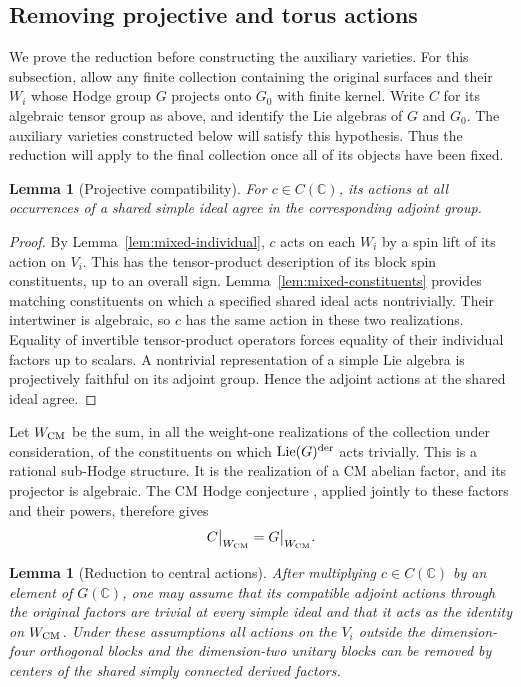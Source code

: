\documentclass[11pt]{article}
\numberwithin{equation}{section}
\newtheorem{lemma}[theorem]{Lemma}
\theoremstyle{definition}
\theoremstyle{remark}
\newcommand{\C}{\mathbb C}
\begin{document}
\subsection{Removing projective and torus actions}

We prove the reduction before constructing the auxiliary varieties.
For this subsection, allow any finite collection containing the original
surfaces and their $W_i$ whose Hodge group $G$ projects onto $G_0$ with
finite kernel.  Write $C$ for its algebraic tensor group as above, and
identify the Lie algebras of $G$ and $G_0$.  The auxiliary varieties
constructed below will satisfy this hypothesis.  Thus the reduction
will apply to the final collection once all of its objects have been
fixed.

\begin{lemma}[Projective compatibility]\label{lem:mixed-projective}
For $c\in C(\C)$, its actions at all occurrences of a shared simple
ideal agree in the corresponding adjoint group.
\end{lemma}

\begin{proof}
By Lemma~\ref{lem:mixed-individual}, $c$ acts on each $W_i$ by a
spin lift of its action on $V_i$.  This has the tensor-product
description of its block spin constituents, up to an overall sign.
Lemma~\ref{lem:mixed-constituents} provides matching constituents
on which a specified shared ideal acts nontrivially.  Their
intertwiner is algebraic, so $c$ has the same action in these two
realizations.  Equality of invertible tensor-product operators
forces equality of their individual factors up to scalars.  A
nontrivial representation of a simple Lie algebra is projectively
faithful on its adjoint group.  Hence the adjoint actions at the
shared ideal agree.
\end{proof}

Let $W_{\rm CM}$ be the sum, in all the weight-one realizations of
the collection under consideration, of the constituents on which
$\operatorname{Lie}(G)^{\rm der}$ acts trivially.  This is a
rational sub-Hodge structure.  It is the realization of a CM abelian
factor, and its projector is algebraic.  The CM Hodge conjecture
\cite[Theorem~1.1]{CM}, applied jointly to these factors and their
powers, therefore gives
\begin{equation}\label{eq:mixed-cm-image}
 C\big|_{W_{\rm CM}}=G\big|_{W_{\rm CM}}.
\end{equation}

\begin{lemma}[Reduction to central actions]\label{lem:mixed-central}
After multiplying $c\in C(\C)$ by an element of $G(\C)$, one may
assume that its compatible adjoint actions through the original
factors are trivial at every simple ideal and that it acts as the
identity on $W_{\rm CM}$.  Under these assumptions all
actions on the $V_i$ outside the dimension-four orthogonal blocks
and the dimension-two unitary blocks can be removed by centers of
the shared simply connected derived factors.
\end{lemma}
\end{document}
